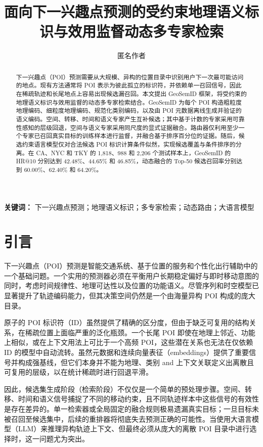 \documentclass[10pt,fontset=none,twocolumn]{ctexart}
\title{\bfseries 面向下一兴趣点预测的受约束地理语义标识与效用监督动态多专家检索}
\author{匿名作者}
\date{}
\begin{document}
\maketitle

\begin{abstract}
下一兴趣点（POI）预测需要从大规模、异构的位置目录中识别用户下一次最可能访问的地点。现有方法通常将 POI 表示为彼此孤立的标识符，并依赖单一召回信号，因此在稀疏轨迹和长尾地点上容易出现候选漏召回。本文提出 GeoSemID 框架，将受约束的地理语义标识与效用监督的动态多专家检索结合。GeoSemID 为每个 POI 构造粗粒度地理编码、细粒度地理编码、规范化类别编码，以及由 POI 元数据离线生成并验证的语义编码。空间、转移、时间和语义专家产生互补候选；其中基于计数的专家采用可靠性感知的层级回退，空间与语义专家采用同尺度的显式证据融合。路由器仅利用至少一个专家已召回真实目标的训练样本进行监督，并融合基于排序百分位的证据。随后，候选约束语言模型仅对合法候选 POI 标识计算条件似然，实现候选覆盖与条件排序的分离。在 CA、NYC 和 TKY 的 1,818、988 和 2,206 个测试样本上，GeoSemID 的 HR@10 分别达到 42.48\%、44.65\% 和 46.85\%，动态融合的 Top-50 候选召回率分别达到 60.00\%、62.40\% 和 64.20\%。
\end{abstract}

\noindent\textbf{关键词：} 下一兴趣点预测；地理语义标识；多专家检索；动态路由；大语言模型

\section{引言}
\label{sec:introduction}

下一兴趣点（POI）预测是智能交通系统、基于位置的服务和个性化出行辅助中的一个基础问题。一个实用的预测器必须在平衡用户长期稳定偏好与即时移动意图的同时，考虑时间规律性、地理可达性以及位置的功能语义。尽管序列和时空模型已显著提升了轨迹编码能力，但其决策空间仍然是一个由海量异构 POI 构成的庞大目录。

原子的 POI 标识符（ID）虽然提供了精确的区分度，但由于缺乏可复用的结构关系，在稀疏位置上面临严重的泛化瓶颈。一个长尾 POI 即使在地理上邻近、功能上相似，或在上下文用法上可比于一个高频 POI，这些潜在关系也无法在仅依赖 ID 的模型中自动流转。虽然元数据和连续向量表征（embeddings）提供了重要信号并构成强基线，但它们本身并不能为地理、类别 and 上下文关联定义出离散且可复用的层级，以在统计稀疏时进行回退平滑。

因此，候选集生成阶段（检索阶段）不仅仅是一个简单的预处理步骤。空间、转移、时间和语义信号捕捉了不同的移动约束，且不同轨迹样本中这些信号的有效性是存在差异的。单一检索器或全局固定的融合规则极易遗漏真实目标；一旦目标未被召回至候选集中，后续的重排器将彻底失去预测正确的可能性。当使用大语言模型（LLM）来推理异构轨迹上下文、但最终必须从庞大的离散 POI 目录中进行选择时，这一问题尤为突出。
\end{document}
